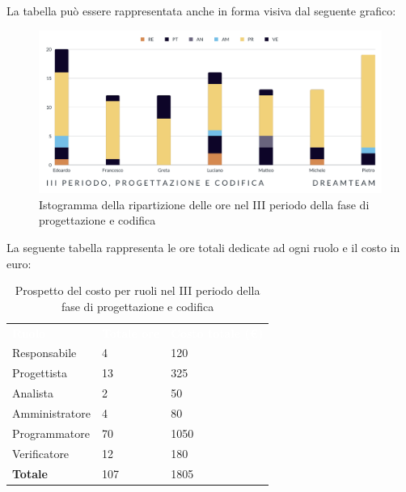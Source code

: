 La tabella può essere rappresentata anche in forma visiva dal seguente grafico:
\begin{figure}[H]
\centering
\includegraphics[scale=0.65]{Sezioni/SezioniPreventivo/grafici/Progettazione_codifica_III_periodo.png}
\caption{Istogramma della ripartizione delle ore nel III periodo della fase di progettazione e codifica}
\end{figure}

La seguente tabella rappresenta le ore totali dedicate ad ogni ruolo e il costo in euro:

\begin{table}[H]
\begin{center}
\renewcommand{\arraystretch}{1.5}
\begin{tabular}{ m{}<{\centering}  m{}<{\centering} m{}<{\centering}}
	\rowcolor{darkblue}
	\textcolor{white}{\textbf{Ruolo}}&\textcolor{white}{\textbf{Totale ore}}&\textcolor{white}{\textbf{Costo totale (\euro)}}\\ 

	Responsabile  & 4 & 120 \\	
	
	Progettista & 13 & 325 \\
	
	Analista & 2 & 50 \\

	Amministratore & 4 & 80 \\
	
	Programmatore & 70 & 1050 \\
	
	Verificatore & 12 & 180 \\
	
	\textbf{Totale} & 107 & 1805 \\
	
\end{tabular}
\caption{Prospetto del costo per ruoli nel III periodo della fase di progettazione e codifica}
\end{center}
\end{table}

